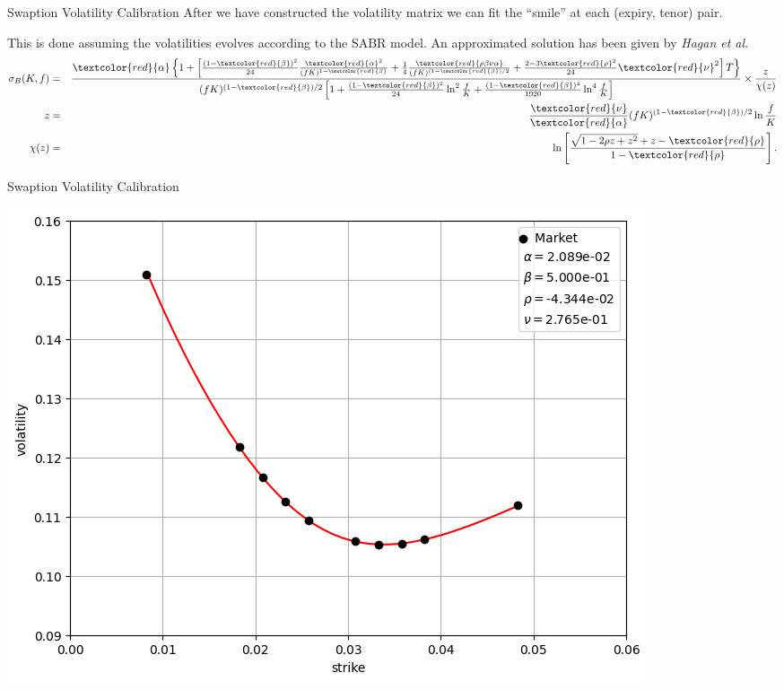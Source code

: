 \documentclass{beamer}
\begin{document}
\begin{frame}{Swaption Volatility Calibration}
  After we have constructed the volatility matrix we can fit the ``smile'' at each (expiry, tenor) pair.

  This is done assuming the volatilities evolves according to the SABR model. An approximated solution has been given by \emph{Hagan et al.}
  \begin{eqnarray} \sigma _{B}(K,f) &=&\frac{\textcolor{red}{\alpha} \left\{ 1+\left[ \frac{\left( 1-\textcolor{red}{\beta} \right) ^{2}}{24}\frac{\textcolor{red}{\alpha} ^{2}}{(fK)^{1-\textcolor{red}{\beta}}}+\frac{1}{4}\frac{\textcolor{red}{\rho \beta \nu\alpha}}{(fK)^{(1-\textcolor{red}{\beta})/2}}+\frac{2-3\textcolor{red}{\rho} ^{2}}{24}\textcolor{red}{\nu}^{2}\right] T\right\} }{(fK)^{(1-\textcolor{red}{\beta})/2}\left[ 1+\frac{(1-\textcolor{red}{\beta})^{2}}{24}\ln ^{2} \frac{f}{K}+\frac{(1-\textcolor{red}{\beta})^{4}}{1920}\ln^{4}\frac{f}{K}\right] } \times \frac{z}{\chi (z)} \notag \\ z &=&\frac{\textcolor{red}{\nu}}{\textcolor{red}{\alpha}}(fK)^{(1-\textcolor{red}{\beta})/2}\ln \frac{f}{K} \notag \\ \chi (z) &=&\ln \left[ \frac{\sqrt{1-2\rho z+z^{2}}+z-\textcolor{red}{\rho}}{1-\textcolor{red}{\rho}}\right] . \notag \end{eqnarray}
\end{frame}

\begin{frame}{Swaption Volatility Calibration}
    \begin{center}
      \includegraphics[width=0.65\linewidth]{images/10y_10y}
    \end{center}
\end{frame}
\end{document}
